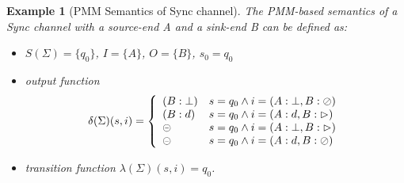 \documentclass[conference, a4paper]{IEEEtran}
\newtheorem{example}{Example}
\newcommand{\rblock}[0]{\circleddash}
\newcommand{\rread}[0]{\rhd}
\newcommand{\rnoread}[0]{\oslash}
\begin{document}
\begin{example}[PMM Semantics of Sync channel]
  The PMM-based semantics of a Sync channel with a source-end A and a sink-end B can be defined as:
  \begin{itemize}
    \item[-] $S(\Sigma)=\{q_0\}$, $I=\{A\}$, $O=\{B\}$, $s_0=q_0$
    \item[-] output function
      \begin{displaymath}
        \delta(\Sigma)(s,i)=\left\{
        \begin{array}[h]{ll}
          (B:\bot) & s=q_0\land i=(A:\bot,B:\rnoread) \\
          (B:d) & s=q_0\land i=(A:d,B:\rread)\\
          \rblock & s=q_0\land i=(A:\bot,B:\rread) \\
          \rblock & s=q_0\land i=(A:d,B:\rnoread) \\
        \end{array}
        \right.
      \end{displaymath}
    \item[-] transition function $\lambda(\Sigma)(s,i)=q_0$.
  \end{itemize}
\end{example}
\end{document}
